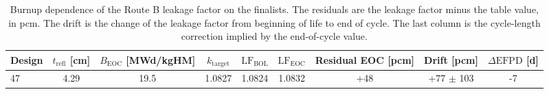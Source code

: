 \begin{table}[htbp]
  \centering
  \caption{Burnup dependence of the Route B leakage factor on the finalists. The residuals are the leakage factor minus the table value, in pcm. The drift is the change of the leakage factor from beginning of life to end of cycle. The last column is the cycle-length correction implied by the end-of-cycle value.}
  \label{tab:kt-burnup}
  \begin{tabular}{lcccccccc}
    \toprule
    Design & $t_\mathrm{refl}$ [cm] & $B_\mathrm{EOC}$ [MWd/kgHM] & $k_\mathrm{target}$ & $\mathrm{LF}_\mathrm{BOL}$ & $\mathrm{LF}_\mathrm{EOC}$ & Residual EOC [pcm] & Drift [pcm] & $\Delta\mathrm{EFPD}$ [d] \\
    \midrule
    47 & 4.29 & 19.5 & 1.0827 & 1.0824 & 1.0832 & +48 & +77 $\pm$ 103 & -7 \\
    \bottomrule
  \end{tabular}
\end{table}
